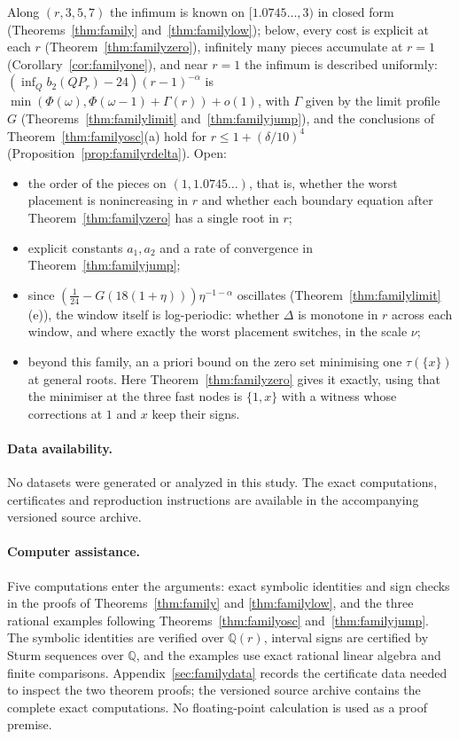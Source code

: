 \documentclass[11pt]{article}
\begin{document}
Along $(r,3,5,7)$ the infimum is known on $[1.0745\ldots,3)$ in closed form
(Theorems~\ref{thm:family} and~\ref{thm:familylow}); below, every cost is
explicit at each $r$ (Theorem~\ref{thm:familyzero}), infinitely many pieces
accumulate at $r=1$ (Corollary~\ref{cor:familyone}), and near $r=1$ the
infimum is described uniformly: $(\inf_Qb_2(QP_r)-24)(r-1)^{-\alpha}$ is
$\min(\Phi(\omega),\Phi(\omega-1)+\Gamma(r))+o(1)$, with $\Gamma$ given
by the limit profile $G$ (Theorems~\ref{thm:familylimit}
and~\ref{thm:familyjump}), and the conclusions of
Theorem~\ref{thm:familyosc}(a) hold for $r\le1+(\delta/10)^4$
(Proposition~\ref{prop:familyrdelta}).  Open:
\begin{itemize}
\item the order of the pieces on $(1,1.0745\ldots)$, that is, whether the
worst placement is nonincreasing in $r$ and whether each boundary equation
after Theorem~\ref{thm:familyzero} has a single root in $r$;
\item explicit constants $a_1,a_2$ and a rate of convergence in
Theorem~\ref{thm:familyjump};
\item since $(\tfrac1{24}-G(18(1+\eta)))\eta^{-1-\alpha}$ oscillates
(Theorem~\ref{thm:familylimit}(e)), the window itself is log-periodic:
whether $\Delta$ is monotone in $r$ across each window, and where exactly
the worst placement switches, in the scale $\nu$;
\item beyond this family, an a priori bound on the zero set minimising one
$\tau(\{x\})$ at general roots.  Here Theorem~\ref{thm:familyzero} gives it
exactly, using that the minimiser at the three fast nodes is $\{1,x\}$ with
a witness whose corrections at $1$ and $x$ keep their signs.
\end{itemize}

\paragraph{Data availability.}
No datasets were generated or analyzed in this study.  The exact
computations, certificates and reproduction instructions are available in
the accompanying versioned source archive.

\paragraph{Computer assistance.}
Five computations enter the arguments: exact symbolic identities and sign
checks in the proofs of Theorems~\ref{thm:family} and
\ref{thm:familylow}, and the three rational examples following
Theorems~\ref{thm:familyosc} and~\ref{thm:familyjump}.  The symbolic
identities are verified over $\mathbb Q(r)$, interval signs are certified by
Sturm sequences over $\mathbb Q$, and the examples use exact rational
linear algebra and finite comparisons.  Appendix~\ref{sec:familydata}
records the certificate data needed to inspect the two theorem proofs; the
versioned source archive contains the complete exact computations.  No
floating-point calculation is used as a proof premise.
\end{document}
